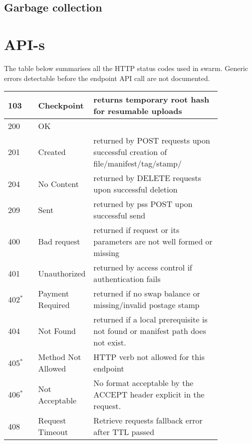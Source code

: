 \section{Garbage collection \statusorange}\label{spec:strategy:garbage-collection}


\chapter{API-s}\label{spec:api}


The table below summarises all the HTTP status codes used in swarm. 
Generic errors detectable before the endpoint API call are not documented.

\begin{definition}
\begin{tabular}{l|p{0.25\linewidth}|p{0.6\linewidth}}
103 & Checkpoint & returns temporary root hash for resumable uploads
\\\hline
200 & OK &
\\
201 & Created & returned by POST requests upon successful creation of file/manifest/tag/stamp/\\
204 & No Content & returned by DELETE requests upon successful  deletion\\
209 & Sent & returned by pss POST upon successful send
\\\hline
400 & Bad request & returned if request or its parameters are not well formed or missing
\\
401 & Unauthorized & returned by access control if authentication fails
\\
402$^{*}$ & Payment Required & returned if no swap balance or missing/invalid postage stamp
\\     
404 & Not Found &
returned if a local prerequisite is not found or manifest path does not exist.
\\
405$^{*}$& Method Not Allowed & HTTP verb  not allowed for this endpoint
\\
406$^{*}$
%
& Not Acceptable & No format acceptable by the {ACCEPT} header explicit in the request. 
\\
408 & Request Timeout & Retrieve requests fallback error after TTL passed
\\

\end{tabular}
\end{definition}
